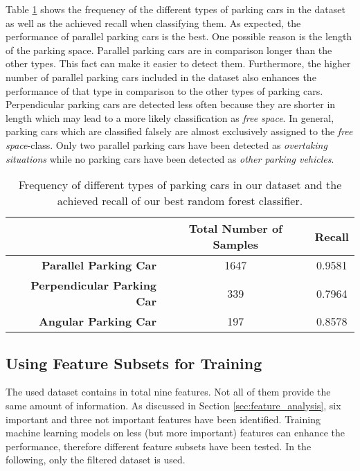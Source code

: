 Table \ref{table:result_different_types_cars} shows the frequency of the different types of parking cars in the dataset as well as the achieved recall when classifying them.
As expected, the performance of parallel parking cars is the best. One possible reason is the length of the parking space. Parallel parking cars are in comparison longer than the other types. This fact can make it easier to detect them. Furthermore, the higher number of parallel parking cars included in the dataset also enhances the performance of that type in comparison to the other types of parking cars. Perpendicular parking cars are detected less often because they are shorter in length which may lead to a more likely classification as \emph{free space}. In general, parking cars which are classified falsely are almost exclusively assigned to the \emph{free space}-class. Only two parallel parking cars have been detected as \emph{overtaking situations} while no parking cars have been detected as \emph{other parking vehicles}.

\begin{table}


\centering
\bgroup
\def\arraystretch{1.4}
\begin{tabular}{| r || c | c |}
\hline
	&
   \textbf{Total Number of Samples} & 
   \textbf{Recall}  \\
\hline
   \textbf{Parallel Parking Car}	&
   1647 & 
   0.9581 \\
\hline
   \textbf{Perpendicular Parking Car}	&
   339 & 
   0.7964 \\
\hline
   \textbf{Angular Parking Car}	&
   197 & 
   0.8578 \\
\hline

\end{tabular}
\egroup

\caption{Frequency of different types of parking cars in our dataset and the achieved recall of our best random forest classifier.}
\label{table:result_different_types_cars}
\end{table}




\subsection{Using Feature Subsets for Training}

The used dataset contains in total nine features. Not all of them provide the same amount of information. As discussed in Section \ref{sec:feature_analysis}, six important and three not important features have been identified. Training machine learning models on less (but more important) features can enhance the performance, therefore different feature subsets have been tested. In the following, only the filtered dataset is used.

